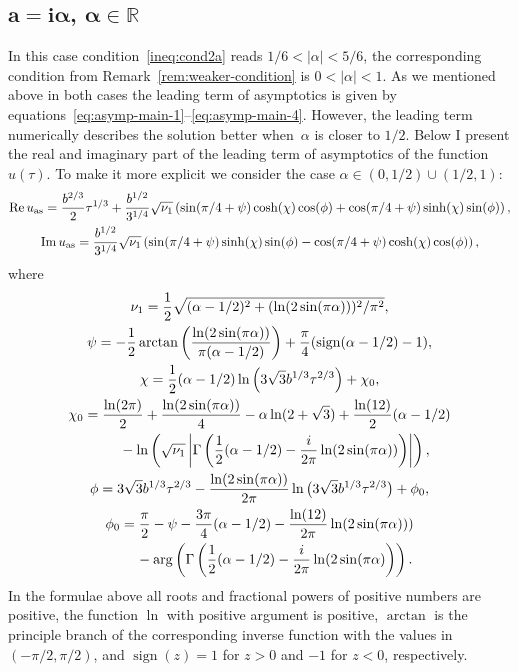 \documentclass[pdftex]{sigma}
\numberwithin{equation}{section}
\begin{document}
\subsection[$a=i\alpha$, $\alpha\in\mathbb R$]{$\boldsymbol{a=i\alpha}$, $\boldsymbol{\alpha\in\mathbb R}$}
In this case condition~\eqref{ineq:cond2a} reads
$1/6<|\alpha|<5/6$, the corresponding condition from Remark~\ref{rem:weaker-condition} is $0<|\alpha|<1$.
As we mentioned above in both cases the leading term of asymptotics is given by
equations~\eqref{eq:asymp-main-1}--\eqref{eq:asymp-main-4}. However, the leading term numerically describes the solution better when~$\alpha$ is closer to $1/2$.
Below I present the real and imaginary part of the leading term of asymptotics of the function $u(\tau)$.
To make it more explicit we consider the case $\alpha\in (0,1/2)\cup(1/2,1)$:
\begin{gather*}
\operatorname{Re}u_{\rm as} =\frac{b^{2/3}}2\tau^{1/3}+\frac{b^{1/2}}{3^{1/4}}\sqrt{\nu_1}
\left(\sin(\pi/4+\psi)\cosh(\chi)\cos(\phi)+\cos(\pi/4+\psi)\sinh(\chi)\sin(\phi)\right) ,\\
\operatorname{Im}u_{\rm as} =\frac{b^{1/2}}{3^{1/4}}\sqrt{\nu_1}
\left(\sin(\pi/4+\psi)\sinh(\chi)\sin(\phi)-\cos(\pi/4+\psi)\cosh(\chi)\cos(\phi)\right),
\end{gather*}
where
\begin{gather*}
\nu_1 =\frac12\sqrt{(\alpha-1/2)^2+(\ln(2\sin(\pi\alpha)))^2/\pi^2},\\
\psi =-\frac12\arctan\left(\frac{\ln(2\sin(\pi\alpha))}{\pi(\alpha-1/2)}\right) +\frac{\pi}4(\operatorname{sign}(\alpha-1/2)-1),\\
\chi =\frac12(\alpha-1/2)\ln\left(3\sqrt{3} b^{1/3}\tau^{2/3}\right)+\chi_0,\\
\chi_0 =\frac{\ln(2\pi)}{2}+\frac{\ln(2\sin(\pi\alpha))}{4}-\alpha\ln(2+\sqrt{3})+\frac{\ln(12)}{2}(\alpha-1/2)\\
\hphantom{\chi_0 =}{} -\ln\left(\sqrt{\nu_1}\left|\Gamma\left(\frac12(\alpha-1/2)
-\frac{i}{2\pi}\ln(2\sin(\pi\alpha))\right)\right|\right),\\
\phi =3\sqrt{3} b^{1/3}\tau^{2/3}-\frac{\ln(2\sin(\pi\alpha))}{2\pi}\ln\big(3\sqrt{3} b^{1/3}\tau^{2/3}\big)+\phi_0,\\
\phi_0 =\frac{\pi}{2}-\psi-\frac{3\pi}4(\alpha-1/2)-\frac{\ln(12)}{2\pi}\ln(2\sin(\pi\alpha)))\\
\hphantom{\phi_0 =}{} -\arg\left(\Gamma\left(\frac12(\alpha-1/2)-\frac{i}{2\pi}\ln(2\sin(\pi\alpha)\right)\right).
\end{gather*}
In the formulae above all roots and fractional powers of positive numbers are positive, the function
$\ln$ with positive argument is positive, $\arctan$ is the principle branch of the corresponding inverse
function with the values in $(-\pi/2,\pi/2)$, and $\operatorname{sign}(z)=1$ for $z>0$ and $-1$ for $z<0$, respectively.
\end{document}
